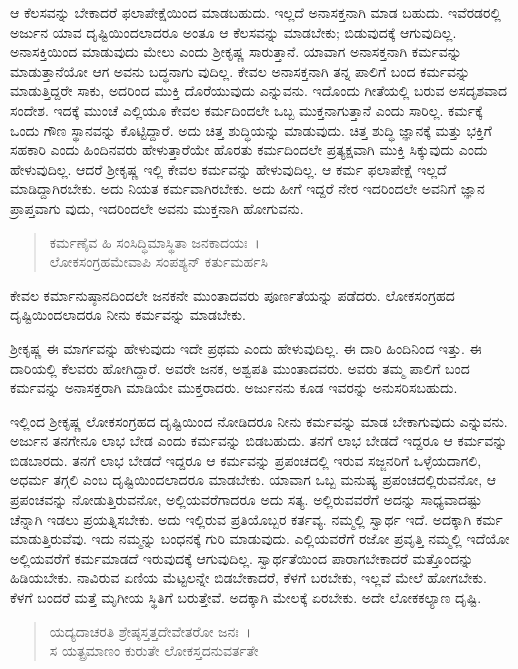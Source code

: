 ಆ ಕೆಲಸವನ್ನು ಬೇಕಾದರೆ ಫಲಾಪೇಕ್ಷೆಯಿಂದ ಮಾಡಬಹುದು. ಇಲ್ಲದೆ ಅನಾಸಕ್ತನಾಗಿ ಮಾಡ ಬಹುದು. ಇವೆರಡರಲ್ಲಿ ಅರ್ಜುನ ಯಾವ ದೃಷ್ಟಿಯಿಂದಲಾದರೂ ಅಂತೂ ಆ ಕೆಲಸವನ್ನು ಮಾಡಬೇಕು; ಬಿಡುವುದಕ್ಕೆ ಆಗುವುದಿಲ್ಲ. ಅನಾಸಕ್ತಿಯಿಂದ ಮಾಡುವುದು ಮೇಲು ಎಂದು ಶ‍್ರೀಕೃಷ್ಣ ಸಾರುತ್ತಾನೆ. ಯಾವಾಗ ಅನಾಸಕ್ತನಾಗಿ ಕರ್ಮವನ್ನು ಮಾಡುತ್ತಾನೆಯೋ ಆಗ ಅವನು ಬದ್ಧನಾಗು ವುದಿಲ್ಲ. ಕೇವಲ ಅನಾಸಕ್ತನಾಗಿ ತನ್ನ ಪಾಲಿಗೆ ಬಂದ ಕರ್ಮವನ್ನು ಮಾಡುತ್ತಿದ್ದರೇ ಸಾಕು, ಅದರಿಂದ ಮುಕ್ತಿ ದೊರೆಯುವುದು ಎನ್ನುವನು. ಇದೊಂದು ಗೀತೆಯಲ್ಲಿ ಬರುವ ಅಸದೃಶವಾದ ಸಂದೇಶ. ಇದಕ್ಕೆ ಮುಂಚೆ ಎಲ್ಲಿಯೂ ಕೇವಲ ಕರ್ಮದಿಂದಲೇ ಒಬ್ಬ ಮುಕ್ತನಾಗುತ್ತಾನೆ ಎಂದು ಸಾರಿಲ್ಲ. ಕರ್ಮಕ್ಕೆ ಒಂದು ಗೌಣ ಸ್ಥಾನವನ್ನು ಕೊಟ್ಟಿದ್ದಾರೆ. ಅದು ಚಿತ್ತ ಶುದ್ಧಿಯನ್ನು ಮಾಡುವುದು. ಚಿತ್ತ ಶುದ್ಧಿ ಜ್ಞಾನಕ್ಕೆ ಮತ್ತು ಭಕ್ತಿಗೆ ಸಹಕಾರಿ ಎಂದು ಹಿಂದಿನವರು ಹೇಳುತ್ತಾರೆಯೇ ಹೊರತು ಕರ್ಮದಿಂದಲೇ ಪ್ರತ್ಯಕ್ಷವಾಗಿ ಮುಕ್ತಿ ಸಿಕ್ಕುವುದು ಎಂದು ಹೇಳುವುದಿಲ್ಲ. ಆದರೆ ಶ‍್ರೀಕೃಷ್ಣ ಇಲ್ಲಿ ಕೇವಲ ಕರ್ಮವನ್ನು ಹೇಳುವುದಿಲ್ಲ. ಆ ಕರ್ಮ ಫಲಾಪೇಕ್ಷೆ ಇಲ್ಲದೆ ಮಾಡಿದ್ದಾಗಿರಬೇಕು. ಅದು ನಿಯತ ಕರ್ಮವಾಗಿರಬೇಕು. ಅದು ಹೀಗೆ ಇದ್ದರೆ ನೇರ ಇದರಿಂದಲೇ ಅವನಿಗೆ ಜ್ಞಾನ ಪ್ರಾಪ್ತವಾಗು ವುದು, ಇದರಿಂದಲೇ ಅವನು ಮುಕ್ತನಾಗಿ ಹೋಗುವನು.

\begin{verse}
ಕರ್ಮಣೈವ ಹಿ ಸಂಸಿದ್ಧಿಮಾಸ್ಥಿತಾ ಜನಕಾದಯಃ~।\\ಲೋಕಸಂಗ್ರಹಮೇವಾಪಿ ಸಂಪಶ್ಯನ್ ಕರ್ತುಮರ್ಹಸಿ 
\end{verse}

{\small ಕೇವಲ ಕರ್ಮಾನುಷ್ಠಾನದಿಂದಲೇ ಜನಕನೇ ಮುಂತಾದವರು ಪೂರ್ಣತೆಯನ್ನು ಪಡೆದರು. ಲೋಕಸಂಗ್ರಹದ ದೃಷ್ಟಿಯಿಂದಲಾದರೂ ನೀನು ಕರ್ಮವನ್ನು ಮಾಡಬೇಕು.}

ಶ‍್ರೀಕೃಷ್ಣ ಈ ಮಾರ್ಗವನ್ನು ಹೇಳುವುದು ಇದೇ ಪ್ರಥಮ ಎಂದು ಹೇಳುವುದಿಲ್ಲ. ಈ ದಾರಿ ಹಿಂದಿನಿಂದ ಇತ್ತು. ಈ ದಾರಿಯಲ್ಲಿ ಕೆಲವರು ಹೋಗಿದ್ದಾರೆ. ಅವರೇ ಜನಕ, ಅಶ್ವಪತಿ ಮುಂತಾದವರು. ಅವರು ತಮ್ಮ ಪಾಲಿಗೆ ಬಂದ ಕರ್ಮವನ್ನು ಅನಾಸಕ್ತರಾಗಿ ಮಾಡಿಯೇ ಮುಕ್ತರಾದರು. ಅರ್ಜುನನು ಕೂಡ ಇವರನ್ನು ಅನುಸರಿಸಬಹುದು.

ಇಲ್ಲಿಂದ ಶ‍್ರೀಕೃಷ್ಣ ಲೋಕಸಂಗ್ರಹದ ದೃಷ್ಟಿಯಿಂದ ನೋಡಿದರೂ ನೀನು ಕರ್ಮವನ್ನು ಮಾಡ ಬೇಕಾಗುವುದು ಎನ್ನುವನು. ಅರ್ಜುನ ತನಗೇನೂ ಲಾಭ ಬೇಡ ಎಂದು ಕರ್ಮವನ್ನು ಬಿಡಬಹುದು. ತನಗೆ ಲಾಭ ಬೇಡದೆ ಇದ್ದರೂ ಆ ಕರ್ಮವನ್ನು ಬಿಡಬಾರದು. ತನಗೆ ಲಾಭ ಬೇಡದೆ ಇದ್ದರೂ ಆ ಕರ್ಮವನ್ನು ಪ್ರಪಂಚದಲ್ಲಿ ಇರುವ ಸಜ್ಜನರಿಗೆ ಒಳ್ಳೆಯದಾಗಲಿ, ಅಧರ್ಮ ತಗ್ಗಲಿ ಎಂಬ ದೃಷ್ಟಿಯಿಂದಲಾದರೂ ಮಾಡಬೇಕು. ಯಾವಾಗ ಒಬ್ಬ ಮನುಷ್ಯ ಪ್ರಪಂಚದಲ್ಲಿರುವನೋ, ಆ ಪ್ರಪಂಚವನ್ನು ನೋಡುತ್ತಿರುವನೋ, ಅಲ್ಲಿಯವರೆಗಾದರೂ ಅದು ಸತ್ಯ. ಅಲ್ಲಿರುವವರೆಗೆ ಅದನ್ನು ಸಾಧ್ಯವಾದಷ್ಟು ಚೆನ್ನಾಗಿ ಇಡಲು ಪ್ರಯತ್ನಿಸಬೇಕು. ಅದು ಇಲ್ಲಿರುವ ಪ್ರತಿಯೊಬ್ಬರ ಕರ್ತವ್ಯ. ನಮ್ಮಲ್ಲಿ ಸ್ವಾರ್ಥ ಇದೆ. ಅದಕ್ಕಾಗಿ ಕರ್ಮ ಮಾಡುತ್ತಿರುವೆವು. ಇದು ನಮ್ಮನ್ನು ಬಂಧನಕ್ಕೆ ಗುರಿ ಮಾಡುವುದು. ಎಲ್ಲಿಯವರೆಗೆ ರಜೋ ಪ್ರವೃತ್ತಿ ನಮ್ಮಲ್ಲಿ ಇದೆಯೋ ಅಲ್ಲಿಯವರೆಗೆ ಕರ್ಮಮಾಡದೆ ಇರುವುದಕ್ಕೆ ಆಗುವುದಿಲ್ಲ. ಸ್ವಾರ್ಥತೆಯಿಂದ ಪಾರಾಗಬೇಕಾದರೆ ಮತ್ತೊಂದನ್ನು ಹಿಡಿಯಬೇಕು. ನಾವಿರುವ ಏಣಿಯ ಮೆಟ್ಟಲನ್ನೇ ಬಿಡಬೇಕಾದರೆ, ಕೆಳಗೆ ಬರಬೇಕು, ಇಲ್ಲವೆ ಮೇಲೆ ಹೋಗಬೇಕು. ಕೆಳಗೆ ಬಂದರೆ ಮತ್ತೆ ಮೃಗೀಯ ಸ್ಥಿತಿಗೆ ಬರುತ್ತೇವೆ. ಅದಕ್ಕಾಗಿ ಮೇಲಕ್ಕೆ ಏರಬೇಕು. ಅದೇ ಲೋಕಕಲ್ಯಾಣ ದೃಷ್ಟಿ.

\begin{verse}
ಯದ್ಯದಾಚರತಿ ಶ್ರೇಷ್ಠಸ್ತತ್ತದೇವೇತರೋ ಜನಃ~।\\ಸ ಯತ್ಪ್ರಮಾಣಂ ಕುರುತೇ ಲೋಕಸ್ತದನುವರ್ತತೇ 
\end{verse}

